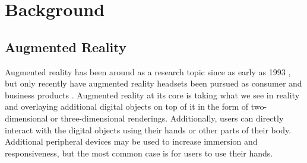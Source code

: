 \documentclass[12pt]{report}
\begin{document}
\chapter{Background}
\section{Augmented Reality}
Augmented reality has been around as a research topic since as early as 1993 \cite{RealWorldArWellnet1993}, but only recently have augmented reality headsets been pursued as consumer and business products \cite{MagicLeapWebsite,MetaWebsite,HoloLensWebsite,GoogleGlassWebsite}. Augmented reality at its core is taking what we see in reality and overlaying additional digital objects on top of it in the form of two-dimensional or three-dimensional renderings. Additionally, users can directly interact with the digital objects using their hands or other parts of their body. Additional peripheral devices may be used to increase immersion and responsiveness, but the most common case is for users to use their hands. \par
\end{document}
